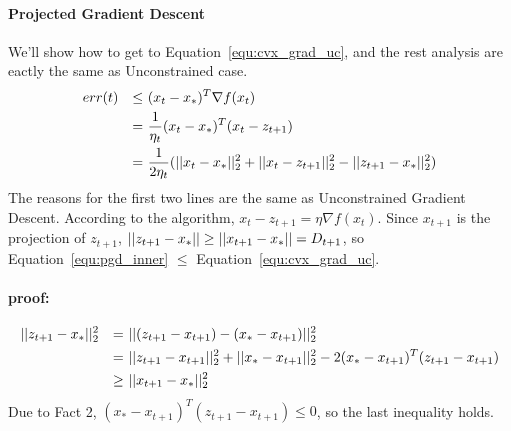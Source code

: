 \documentclass[11pt]{article}
\begin{document}
\paragraph{Projected Gradient Descent}
We'll show how to get to Equation~\ref{equ:cvx_grad_uc}, and the rest analysis are eactly the same as Unconstrained case.
\begin{alignat}{3}
err(t) && \leq &~(x_t-x_*)^T\nabla f(x_t) \notag\\
       && = &~\frac{1}{\eta_t}(x_t-x_*)^T(x_t-z_{t+1}) \notag \\
       && = &~\frac{1}{2\eta_t}(||x_t - x_*||_2^2 + ||x_t - z_{t+1}||_2^2 - ||z_{t+1}-x_*||_2^2) \label{equ:pgd_inner}
\end{alignat}
The reasons for the first two lines are the same as Unconstrained Gradient Descent. 
According to the algorithm, $x_t - z_{t+1} = \eta \nabla f(x_t)$.
Since $x_{t+1}$ is the projection of $z_{t+1}$, $||z_{t+1} - x_*|| \geq ||x_{t+1}-x_*|| = D_{t+1}$, so Equation~\ref{equ:pgd_inner} $\leq$ Equation~\ref{equ:cvx_grad_uc}. 

\paragraph{proof:}
\begin{alignat}{3}
 ||z_{t+1} - x_*||_2^2 && = &~ ||(z_{t+1}-x_{t+1})-(x_* - x_{t+1})||_2^2 \notag \\
                        && = &~ ||z_{t+1}-x_{t+1}||_2^2 + ||x_*-x_{t+1}||_2^2 - 2(x_*-x_{t+1})^T(z_{t+1}-x_{t+1}) \notag \\
                        && \geq &~ ||x_{t+1}-x_*||_2^2 \notag
\end{alignat}
Due to Fact 2, $(x_*-x_{t+1})^T(z_{t+1}-x_{t+1}) \leq 0$, so the last inequality holds.
\\
\end{document}
